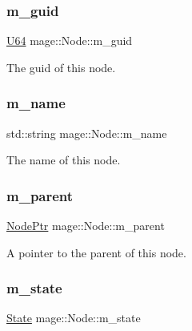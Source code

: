 \subsubsection{\texorpdfstring{m\+\_\+guid}{m\_guid}}
{\footnotesize\ttfamily \mbox{\hyperlink{namespacemage_a6672cf3c861707ce4a3235a3eb43941d}{U64}} mage\+::\+Node\+::m\+\_\+guid\hspace{0.3cm}{\ttfamily [private]}}

The guid of this node. \mbox{\label{classmage_1_1_node_a69cfc52bdc0572dfc776e2ff27c9eec2}} 
\subsubsection{\texorpdfstring{m\+\_\+name}{m\_name}}
{\footnotesize\ttfamily std\+::string mage\+::\+Node\+::m\+\_\+name\hspace{0.3cm}{\ttfamily [private]}}

The name of this node. \mbox{\label{classmage_1_1_node_aa04f166b52fca444c8756c0864a16cde}} 
\subsubsection{\texorpdfstring{m\+\_\+parent}{m\_parent}}
{\footnotesize\ttfamily \mbox{\hyperlink{classmage_1_1_node_ac575dc006e0ae1134277ade977dc06b6}{Node\+Ptr}} mage\+::\+Node\+::m\+\_\+parent\hspace{0.3cm}{\ttfamily [private]}}

A pointer to the parent of this node. \mbox{\label{classmage_1_1_node_a76b775e32bb001c54a9927461eaf7926}} 
\subsubsection{\texorpdfstring{m\+\_\+state}{m\_state}}
{\footnotesize\ttfamily \mbox{\hyperlink{namespacemage_ae47d13d8477ee94893b9a3947d28eebc}{State}} mage\+::\+Node\+::m\+\_\+state\hspace{0.3cm}{\ttfamily [private]}}

